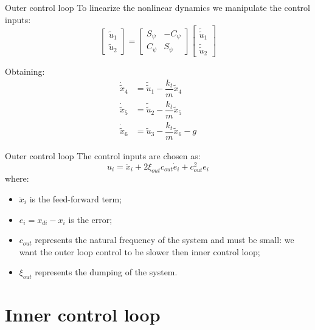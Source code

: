 \begin{frame}{Outer control loop}
	To linearize the nonlinear dynamics we manipulate the control inputs:
	\begin{equation}
	\begin{bmatrix}
	\tilde{u}_1 \\ \tilde{u}_2
	\end{bmatrix} = 
	\begin{bmatrix}
	S_{\psi} & -C_{\psi} \\
	C_{\psi} & S_{\psi} 
	\end{bmatrix}
	\begin{bmatrix}
	\tilde{\tilde{u}}_1 \\ \tilde{\tilde{u}}_2
	\end{bmatrix}
	\label{rotation_matrix_outer}
	\end{equation}
	
	Obtaining:
	\begin{align*}
	\dot{\tilde{x}}_4 & = \tilde{\tilde{u}}_1 - \dfrac{k_t}{m} \tilde{x}_4 \\
	\dot{\tilde{x}}_5 & = \tilde{\tilde{u}}_2 - \dfrac{k_t}{m} \tilde{x}_5 \\
	\dot{\tilde{x}}_6 & = \tilde{u}_3 - \dfrac{k_t}{m} \tilde{x}_6 - g
	\end{align*}
	\pause
	\centering
\end{frame}

\begin{frame}{Outer control loop}
	The control inputs are chosen as:
	\begin{equation}
	u_i = \ddot{x}_i + 2\xi_{out}c_{out} \dot{e}_i + c_{out}^2 e_i 
	\end{equation}
	where:
	\begin{itemize}
		\item $ \ddot{x}_i $ is the feed-forward term;
		\item $ e_i = x_{di} - x_i $ is the error;
		\item $ c_{out} $ represents the natural frequency of the system and must be small: we want the outer loop control to be slower then inner control loop;
		\item $ \xi_{out} $ represents the dumping of the system.
	\end{itemize}
\end{frame}

\section*{Inner control loop}

